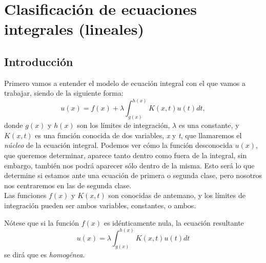 
\chapter{Clasificación de ecuaciones integrales (lineales)}\label{ch:primer-capitulo}

\section{Introducción}
Primero vamos a entender el modelo de ecuación integral con el que vamos a trabajar, siendo de la siguiente forma:
\begin{equation}\label{}
	u(x) = f(x) + \lambda \int_{g(x)}^{h(x)} K(x,t)u(t)dt,
\end{equation}
donde $g(x)$ y $h(x)$ son los límites de integración, $\lambda$ es una constante, y $K(x,t)$ es una función conocida de dos variables, \textit{x} y \textit{t}, que llamaremos el \textit{núcleo} de la ecuación integral. Podemos ver cómo la función desconocida $u(x)$, que queremos determinar,  aparece tanto dentro como fuera de la integral, sin embargo, también nos podrá aparecer sólo dentro de la misma. Esto será lo que determine si estamos ante una ecuación de primera o segunda clase, pero nosotros nos centraremos en las de segunda clase.\\

Las funciones $f(x)$ y $K(x,t)$ son conocidas de antemano, y los límites de integración pueden ser ambos variables, constantes, o ambos.\\
\begin{observacion}
	Nótese que si la función $f(x)$ es idénticamente nula, la ecuación resultante 
	\begin{equation}\label{}
		u(x) = \lambda \int_{g(x)}^{h(x)} K(x,t)u(t)dt
	\end{equation}
	se dirá que es \textit{homogénea}.
\end{observacion}

